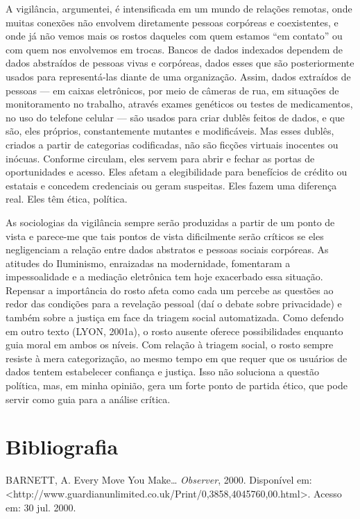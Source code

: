 A vigilância, argumentei, é intensificada em um mundo de relações
remotas, onde muitas conexões não envolvem diretamente pessoas corpóreas
e coexistentes, e onde já não vemos mais os rostos daqueles com quem
estamos ``em contato'' ou com quem nos envolvemos em trocas. Bancos de
dados indexados dependem de dados abstraídos de pessoas vivas e
corpóreas, dados esses que são posteriormente usados para representá-las
diante de uma organização. Assim, dados extraídos de pessoas --- em
caixas eletrônicos, por meio de câmeras de rua, em situações de
monitoramento no trabalho, através exames genéticos ou testes de
medicamentos, no uso do telefone celular --- são usados para criar
dublês feitos de dados, e que são, eles próprios, constantemente
mutantes e modificáveis. Mas esses dublês, criados a partir de
categorias codificadas, não são ficções virtuais inocentes ou inócuas.
Conforme circulam, eles servem para abrir e fechar as portas de
oportunidades e acesso. Eles afetam a elegibilidade para benefícios de
crédito ou estatais e concedem credenciais ou geram suspeitas. Eles
fazem uma diferença real. Eles têm ética, política.

As sociologias da vigilância sempre serão produzidas a partir de um
ponto de vista e parece-me que tais pontos de vista dificilmente serão
críticos se eles negligenciam a relação entre dados abstratos e pessoas
sociais corpóreas. As atitudes do Iluminismo, enraizadas na modernidade,
fomentaram a impessoalidade e a mediação eletrônica tem hoje exacerbado
essa situação. Repensar a importância do rosto afeta como cada um
percebe as questões ao redor das condições para a revelação pessoal (daí
o debate sobre privacidade) e também sobre a justiça em face da triagem
social automatizada. Como defendo em outro texto (LYON, 2001a), o rosto
ausente oferece possibilidades enquanto guia moral em ambos os níveis.
Com relação à triagem social, o rosto sempre resiste à mera
categorização, ao mesmo tempo em que requer que os usuários de dados
tentem estabelecer confiança e justiça. Isso não soluciona a questão
política, mas, em minha opinião, gera um forte ponto de partida ético,
que pode servir como guia para a análise crítica.

\section{Bibliografia}

BARNETT, A. Every Move You Make\ldots{} \emph{Observer}, 2000.
Disponível em:
\textless{}http://www.guardianunlimited.co.uk/Print/0,3858,4045760,00.html\textgreater{}.
Acesso em: 30 jul. 2000.

